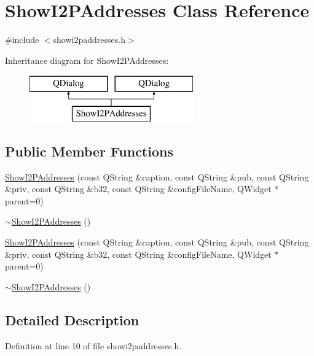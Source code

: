 \hypertarget{class_show_i2_p_addresses}{}\section{Show\+I2\+P\+Addresses Class Reference}
\label{class_show_i2_p_addresses}


{\ttfamily \#include $<$showi2paddresses.\+h$>$}

Inheritance diagram for Show\+I2\+P\+Addresses\+:\begin{figure}[H]
\begin{center}
\leavevmode
\includegraphics[height=2.000000cm]{class_show_i2_p_addresses}
\end{center}
\end{figure}
\subsection*{Public Member Functions}
\begin{DoxyCompactItemize}
\item 
\hyperlink{class_show_i2_p_addresses_a3e179105873e6a9a0d196baae99dff24}{Show\+I2\+P\+Addresses} (const Q\+String \&caption, const Q\+String \&pub, const Q\+String \&priv, const Q\+String \&b32, const Q\+String \&config\+File\+Name, Q\+Widget $\ast$parent=0)
\item 
\hyperlink{class_show_i2_p_addresses_aa656299035626d75777594accd83a05c}{$\sim$\+Show\+I2\+P\+Addresses} ()
\item 
\hyperlink{class_show_i2_p_addresses_a3e179105873e6a9a0d196baae99dff24}{Show\+I2\+P\+Addresses} (const Q\+String \&caption, const Q\+String \&pub, const Q\+String \&priv, const Q\+String \&b32, const Q\+String \&config\+File\+Name, Q\+Widget $\ast$parent=0)
\item 
\hyperlink{class_show_i2_p_addresses_aa656299035626d75777594accd83a05c}{$\sim$\+Show\+I2\+P\+Addresses} ()
\end{DoxyCompactItemize}


\subsection{Detailed Description}


Definition at line 10 of file showi2paddresses.\+h.



